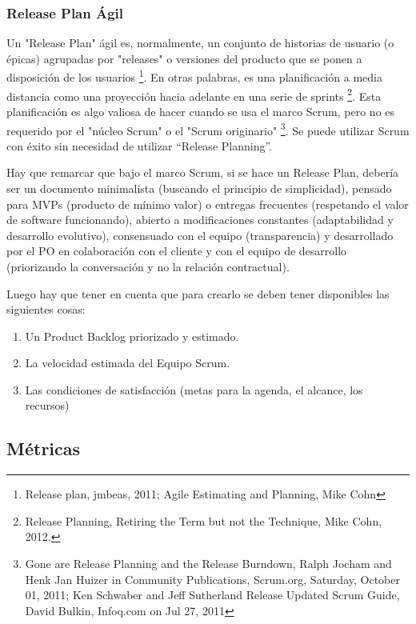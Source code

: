 \subsubsection{Release Plan Ágil}

Un "Release Plan" ágil es, normalmente, un conjunto de historias de usuario (o épicas) agrupadas por "releases" o versiones del producto que se ponen a disposición de los usuarios \footnote{Release plan, jmbeas, 2011; Agile Estimating and Planning, Mike Cohn}. En otras palabras, es una planificación a media distancia como una proyección hacia adelante en una serie de sprints \footnote{Release Planning, Retiring the Term but not the Technique, Mike Cohn, 2012.}. Esta planificación es algo valiosa de hacer cuando se usa el marco Scrum, pero no es requerido por el "núcleo Scrum" o el "Scrum originario" \footnote{Gone are Release Planning and the Release Burndown, Ralph Jocham and Henk Jan Huizer in Community Publications, Scrum.org, Saturday, October 01, 2011; Ken Schwaber and Jeff Sutherland Release Updated Scrum Guide, David Bulkin, Infoq.com on Jul 27, 2011}. Se puede utilizar Scrum con éxito sin necesidad de utilizar “Release Planning”.

Hay que remarcar que bajo el marco Scrum, si se hace un Release Plan, debería ser un documento minimalista (buscando el principio de simplicidad), pensado para MVPs (producto de mínimo valor) o entregas frecuentes (respetando el valor de software funcionando), abierto a modificaciones constantes (adaptabilidad y desarrollo evolutivo), consensuado con el equipo (transparencia) y desarrollado por el PO en colaboración con el cliente y con el equipo de desarrollo (priorizando la conversación y no la relación contractual).

Luego hay que tener en cuenta que para crearlo se deben tener disponibles las siguientes cosas:

\begin{enumerate}
\item Un Product Backlog priorizado y estimado.
\item La velocidad estimada del Equipo Scrum.
\item Las condiciones de satisfacción (metas para la agenda, el alcance, los recursos)
\end{enumerate}


\subsection{Métricas}

